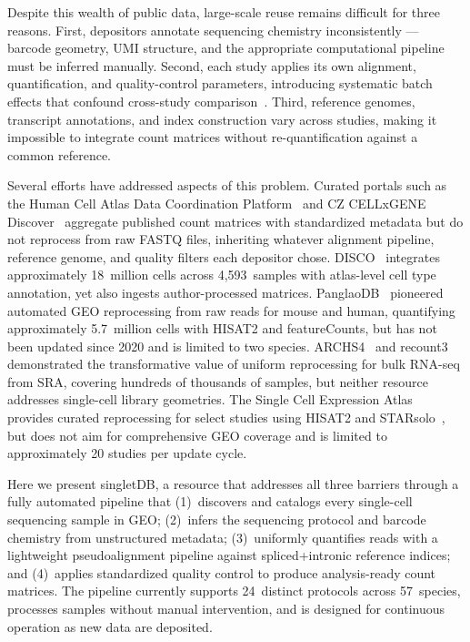\documentclass[10pt,twocolumn,letterpaper]{article}
\begin{document}
Despite this wealth of public data, large-scale reuse remains difficult
for three reasons. First, depositors annotate sequencing chemistry
inconsistently --- barcode geometry, UMI structure, and the appropriate
computational pipeline must be inferred manually. Second, each study
applies its own alignment, quantification, and quality-control parameters,
introducing systematic batch effects that confound cross-study
comparison~\citep{luecken2022}. Third, reference genomes, transcript
annotations, and index construction vary across studies, making it
impossible to integrate count matrices without re-quantification against
a common reference.

Several efforts have addressed aspects of this problem. Curated portals
such as the Human Cell Atlas Data Coordination Platform~\citep{hca2017}
and CZ CELLxGENE Discover~\citep{cellxgene2023} aggregate published count
matrices with standardized metadata but do not reprocess from raw FASTQ
files, inheriting whatever alignment pipeline, reference genome, and
quality filters each depositor chose. DISCO~\citep{li2022disco} integrates
approximately 18~million cells across 4,593~samples with atlas-level cell
type annotation, yet also ingests author-processed matrices.
PanglaoDB~\citep{franzen2019} pioneered automated GEO reprocessing from
raw reads for mouse and human, quantifying approximately 5.7~million cells
with HISAT2 and featureCounts, but has not been updated since 2020 and is
limited to two species.
ARCHS4~\citep{lachmann2018} and recount3~\citep{wilks2021recount3}
demonstrated the transformative value of uniform reprocessing for bulk
RNA-seq from SRA, covering hundreds of thousands of samples, but neither
resource addresses single-cell library geometries.
The Single Cell Expression Atlas~\citep{papatheodorou2020} provides curated
reprocessing for select studies using HISAT2 and
STARsolo~\citep{kaminow2021starsolo}, but does not aim for comprehensive
GEO coverage and is limited to approximately 20 studies per update cycle.

Here we present singletDB, a resource that addresses all three barriers
through a fully automated pipeline that (1)~discovers and catalogs every
single-cell sequencing sample in GEO; (2)~infers the sequencing protocol
and barcode chemistry from unstructured metadata; (3)~uniformly quantifies
reads with a lightweight pseudoalignment pipeline against spliced+intronic
reference indices; and (4)~applies standardized quality control to produce
analysis-ready count matrices. The pipeline currently supports 24~distinct
protocols across 57~species, processes samples without manual intervention,
and is designed for continuous operation as new data are deposited.
\end{document}
